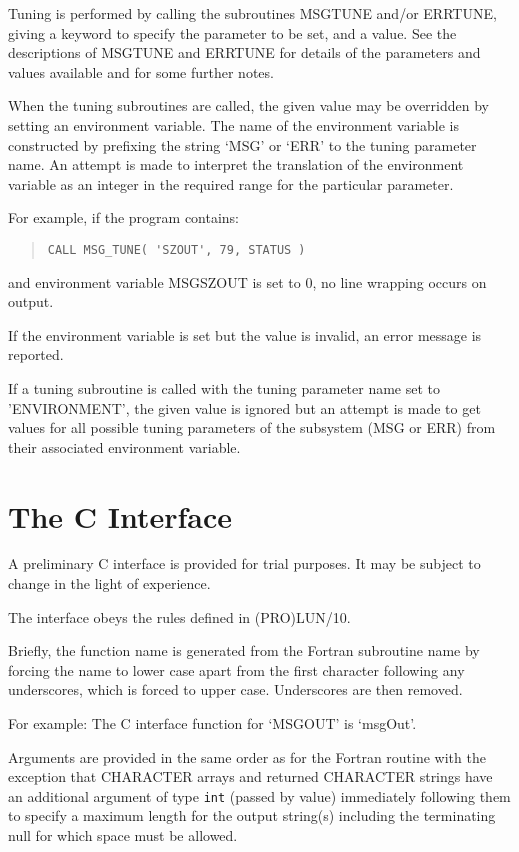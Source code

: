 \documentclass[twoside,11pt]{article}
\newcommand{\htmlref}[2]{#1}
\newcommand{\xlabel}[1]{}
\renewcommand{\_}{\texttt{\symbol{95}}}
\begin{document}
Tuning is performed by calling the subroutines MSG\_TUNE and/or ERR\_TUNE,
giving a keyword to specify the parameter to be set, and a value.
See the descriptions of
\htmlref{MSG\_TUNE}{MSG_TUNE}
and
\htmlref{ERR\_TUNE}{ERR_TUNE}
for details of the parameters and values available and for some further notes.

When the tuning subroutines are called, the given value may be overridden by
setting an environment variable.  The name of the environment variable is
constructed by prefixing the string `MSG\_' or `ERR\_' to the tuning parameter
name. An attempt is made to interpret the translation of the environment
variable as an integer in the required range for the particular parameter.

For example, if the program contains:
\begin{quote} \begin{verbatim}
CALL MSG_TUNE( 'SZOUT', 79, STATUS )
\end{verbatim} \end{quote}
and environment variable MSG\_SZOUT is set to 0, no line wrapping occurs
on output.

If the environment variable is set but the value is invalid, an error message
is reported.

If a tuning subroutine is called with the tuning parameter name set to
'ENVIRONMENT', the given value is ignored but an attempt is made to get values
for all possible tuning parameters of the subsystem (MSG or ERR) from their
associated environment variable.

\newpage
\section{\xlabel{the_c_interface}\label{the_c_interface}The C Interface}
A preliminary C interface is provided for trial purposes. It may be subject to
change in the light of experience.

The interface obeys the rules defined in (PRO)LUN/10.

Briefly, the function name is generated from the Fortran subroutine name by
forcing the name to lower case apart from the first character following any
underscores, which is forced to upper case. Underscores are then removed.

For example: The C interface function for `MSG\_OUT' is `msgOut'.

Arguments are provided in the same order as for the Fortran routine with the
exception that CHARACTER arrays and returned CHARACTER strings
have an additional argument of type \texttt{int} (passed by value) immediately
following them to specify a maximum length for the output string(s) including
the terminating null for which space must be allowed.
\end{document}
